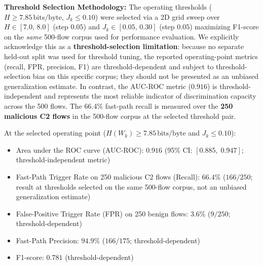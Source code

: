 \documentclass{ieeeaccess}
\renewcommand{\_}{\textunderscore\allowbreak}
\begin{document}
\textbf{Threshold Selection Methodology:}
The operating thresholds ($H \ge 7.85\,\text{bits/byte}$, $J_k \le 0.10$) were selected via a 2D grid sweep over
$H \in [7.0,\, 8.0]$ (step $0.05$) and $J_k \in [0.05,\, 0.30]$ (step $0.05$) maximizing F1-score on the
\emph{same} 500-flow corpus used for performance evaluation. We explicitly acknowledge this as a \textbf{threshold-selection
limitation}: because no separate held-out split was used for threshold tuning, the reported operating-point
metrics (recall, FPR, precision, F1) are threshold-dependent and subject to threshold-selection bias on this specific corpus;
they should not be presented as an unbiased generalization estimate. In contrast, the AUC-ROC metric ($0.916$) is threshold-independent and represents the most reliable indicator of discrimination capacity across the 500 flows.
The 66.4\% fast-path recall is measured over the \textbf{250 malicious C2 flows} in the 500-flow corpus at the selected threshold pair.

At the selected operating point ($H(W_k) \ge 7.85\,\text{bits/byte}$ and $J_k \le 0.10$):
\begin{itemize}
  \item Area under the ROC curve (AUC-ROC): $\mathbf{0.916}$ (95\% CI: $[0.885,\; 0.947]$; threshold-independent metric)
  \item Fast-Path Trigger Rate on 250 malicious C2 flows (Recall): $66.4\%$ ($166/250$; result at thresholds selected on the same 500-flow corpus, not an unbiased generalization estimate)
  \item False-Positive Trigger Rate (FPR) on 250 benign flows: $3.6\%$ ($9/250$; threshold-dependent)
  \item Fast-Path Precision: $94.9\%$ ($166/175$; threshold-dependent)
  \item F1-score: $0.781$ (threshold-dependent)
\end{itemize}
\end{document}
